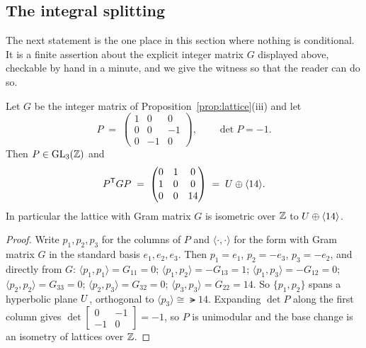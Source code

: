 \subsection{The integral splitting}

The next statement is the one place in this section where nothing is
conditional. It is a finite assertion about the explicit integer matrix $G$
displayed above, checkable by hand in a minute, and we give the witness so
that the reader can do so.

\begin{proposition}\label{prop:usplit}
Let $G$ be the integer matrix of Proposition~\ref{prop:lattice}(iii) and let
\[
  P \;=\;
  \begin{pmatrix} 1&0&0\\ 0&0&-1\\ 0&-1&0\end{pmatrix},
  \qquad \det P = -1 .
\]
Then $P \in \operatorname{GL}_3(\mathbb{Z})$ and
\[
  P^{\mathsf T} G P \;=\;
  \begin{pmatrix} 0&1&0\\ 1&0&0\\ 0&0&14 \end{pmatrix}
  \;=\; U \oplus \langle 14\rangle.
\]
In particular the lattice with Gram matrix $G$ is isometric over $\mathbb{Z}$ to
$U\oplus\langle 14\rangle$.
\end{proposition}

\begin{proof}
Write $p_1,p_2,p_3$ for the columns of $P$ and $\langle\cdot,\cdot\rangle$ for
the form with Gram matrix $G$ in the standard basis $e_1,e_2,e_3$. Then
$p_1 = e_1$, $p_2 = -e_3$, $p_3 = -e_2$, and directly from $G$:
$\langle p_1,p_1\rangle = G_{11} = 0$;
$\langle p_1,p_2\rangle = -G_{13} = 1$;
$\langle p_1,p_3\rangle = -G_{12} = 0$;
$\langle p_2,p_2\rangle = G_{33} = 0$;
$\langle p_2,p_3\rangle = G_{32} = 0$;
$\langle p_3,p_3\rangle = G_{22} = 14$.
So $\{p_1,p_2\}$ spans a hyperbolic plane $U$, orthogonal to $\langle
p_3\rangle \cong \lat{14}$. Expanding $\det P$ along the first column gives
$\det\left[\begin{smallmatrix}0&-1\\-1&0\end{smallmatrix}\right] = -1$, so $P$
is unimodular and the base change is an isometry of lattices over $\mathbb{Z}$.
\end{proof}

